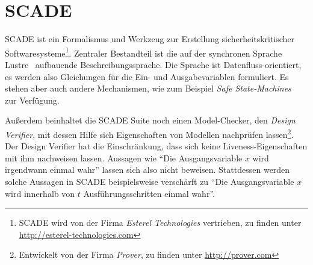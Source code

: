 \section{SCADE}
\label{sec:scade}
SCADE ist ein Formalismus und Werkzeug zur Erstellung sicherheitskritischer Softwaresysteme\footnote{SCADE wird von der Firma \emph{Esterel Technologies} vertrieben, zu finden unter \url{http://esterel-technologies.com}}.
Zentraler Bestandteil ist die auf der synchronen Sprache Lustre~\cite{lustre} aufbauende Beschreibungssprache.
Die Sprache ist Datenfluss-orientiert, es werden also Gleichungen für die Ein- und Ausgabevariablen formuliert.
Es stehen aber auch andere Mechanismen, wie zum Beispiel \emph{Safe State-Machines}~\cite{ssm} zur Verfügung.

Außerdem beinhaltet die SCADE Suite noch einen Model-Checker, den \emph{Design Verifier}, mit dessen Hilfe sich Eigenschaften von Modellen nachprüfen lassen\footnote{Entwickelt von der Firma \emph{Prover}, zu finden unter \url{http://prover.com}}.
Der Design Verifier hat die Einschränkung, dass sich keine Liveness-Eigenschaften mit ihm nachweisen lassen.
Aussagen wie "`Die Ausgangsvariable $x$ wird irgendwann einmal wahr"' lassen sich also nicht beweisen.
Stattdessen werden solche Aussagen in SCADE beispielsweise verschärft zu "`Die Ausgangsvariable $x$ wird innerhalb von $t$ Ausführungsschritten einmal wahr"'.